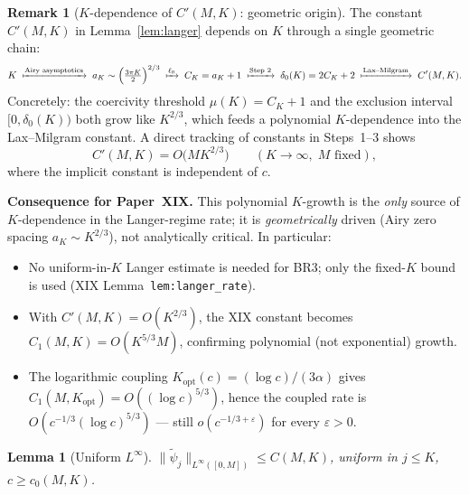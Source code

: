 \documentclass[12pt,a4paper]{amsart}
\newtheorem{lemma}[theorem]{Lemma}
\theoremstyle{definition}
\newtheorem{remark}[theorem]{Remark}
\newcommand{\normh}[2]{\|#1\|_{#2}}
\begin{document}
\begin{remark}[$K$-dependence of $C'(M,K)$: geometric origin]
\label{rem:langerkdep}
The constant $C'(M,K)$ in Lemma~\ref{lem:langer} depends on $K$
through a single geometric chain:
\[
  K \;\xmapsto{\text{Airy asymptotics}}\;
  a_K \sim \Bigl(\tfrac{3\pi K}{2}\Bigr)^{2/3}
  \;\xmapsto{\ell_0}\;
  C_K = a_K + 1
  \;\xmapsto{\text{Step 2}}\;
  \delta_0(K) = 2C_K + 2
  \;\xmapsto{\text{Lax--Milgram}}\;
  C'(M,K).
\]
Concretely: the coercivity threshold $\mu(K) = C_K + 1$ and the
exclusion interval $[0,\delta_0(K))$ both grow like $K^{2/3}$,
which feeds a polynomial $K$-dependence into the Lax--Milgram constant.
A direct tracking of constants in Steps~1--3 shows
\begin{equation}\label{eq:Cprimescale}
  C'(M,K) = O\bigl(M K^{2/3}\bigr) \qquad (K\to\infty,\; M\text{ fixed}),
\end{equation}
where the implicit constant is independent of $c$.

\medskip
\textbf{Consequence for Paper~XIX.}
This polynomial $K$-growth is the \emph{only} source of
$K$-dependence in the Langer-regime rate; it is
\emph{geometrically} driven (Airy zero spacing $a_K\sim K^{2/3}$),
not analytically critical.
In particular:
\begin{itemize}[nosep]
  \item No uniform-in-$K$ Langer estimate is needed for BR3;
    only the fixed-$K$ bound is used (XIX Lemma~\texttt{lem:langer\_rate}).
  \item With $C'(M,K) = O(K^{2/3})$, the XIX constant becomes
    $C_1(M,K) = O(K^{5/3} M)$,
    confirming polynomial (not exponential) growth.
  \item The logarithmic coupling $K_\mathrm{opt}(c)=(\log c)/(3\alpha)$
    gives $C_1(M,K_\mathrm{opt}) = O((\log c)^{5/3})$,
    hence the coupled rate is
    $O(c^{-1/3}(\log c)^{5/3})$ --- still $o(c^{-1/3+\varepsilon})$
    for every $\varepsilon > 0$.
\end{itemize}
\end{remark}

\begin{lemma}[Uniform $L^\infty$]
\label{lem:linf}
$\normh{\tilde\psi_j}{L^\infty([0,M])}\leq C(M,K)$,
uniform in $j\leq K$, $c\geq c_0(M,K)$.
\end{lemma}
\end{document}
